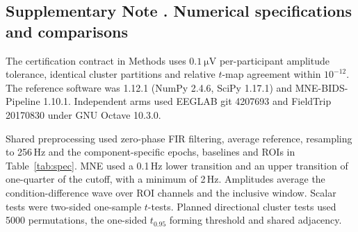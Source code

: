 \subsection*{Supplementary Note \thesuppnote. Numerical specifications and comparisons}
\label{si:numerical}

The certification contract in Methods uses \(\SI{0.1}{\uV}\) per-participant amplitude tolerance, identical cluster partitions and relative \(t\)-map agreement within \(10^{-12}\). The reference software was \mne{} 1.12.1 (NumPy 2.4.6, SciPy 1.17.1) and MNE-BIDS-Pipeline 1.10.1. Independent arms used EEGLAB git 4207693 and FieldTrip 20170830 under GNU Octave 10.3.0.

Shared preprocessing used zero-phase FIR filtering, average reference, resampling to 256\,Hz and the component-specific epochs, baselines and ROIs in Table~\ref*{tab:spec}. MNE used a 0.1\,Hz lower transition and an upper transition of one-quarter of the cutoff, with a minimum of 2\,Hz. Amplitudes average the condition-difference wave over ROI channels and the inclusive window. Scalar tests were two-sided one-sample \(t\)-tests. Planned directional cluster tests used 5000 permutations, the one-sided \(t_{0.95}\) forming threshold and shared adjacency.
\begin{table}[!htbp]
\centering\footnotesize
\caption{Specifications of the five certified ERP analyses. Shared processing, software and statistical settings are given in Supplementary Note~\ref*{si:numerical}. Both measurement-window endpoints are included.}
\label{tab:spec}
\end{table}

